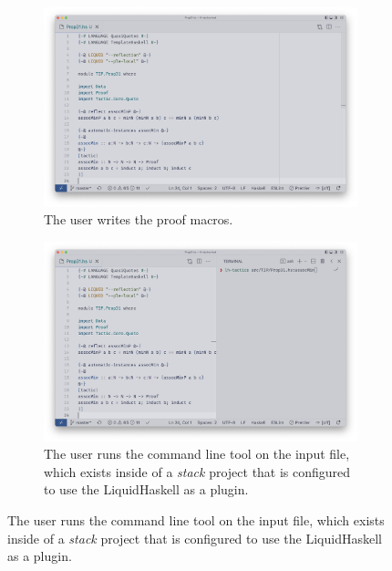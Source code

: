 \begin{figure}
  \centering

  \begin{subfigure}[t][][t]{1\textwidth}
    \begin{minipage}[c]{0.5\textwidth}
      \caption{The user writes the proof macros.}
    \end{minipage}
    \hfill
    \begin{minipage}[c]{0.49\textwidth}
      \includegraphics[width=\textwidth]{example-screenshots/macros.png}
    \end{minipage}
  \end{subfigure}
  \begin{subfigure}[t][][t]{1\textwidth}
    \begin{minipage}[c]{0.5\textwidth}
      \caption{The user runs the  command line tool on the input
      file, which exists inside of a \textit{stack} project that is configured to
      use the LiquidHaskell as a plugin.}
    \end{minipage}
    \hfill
    \begin{minipage}[c]{0.49\textwidth}
      \includegraphics[width=\textwidth]{example-screenshots/run.png}

\end{minipage}
\end{subfigure}
\end{figure}
